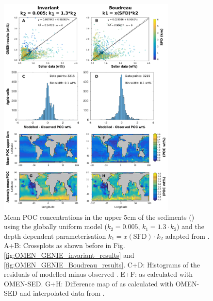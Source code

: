 \documentclass[gmd, manuscript]{copernicus}
\begin{document}
\begin{figure}[htbp]
\begin{center}
	\includegraphics[width=0.8\textwidth]{figures/OMEN-GENIE-Exp/0_2908_BOUDREAU_DEPTH_DEP_POC_BigTriangles_120118.pdf}
	\caption{Mean POC concentrations in the upper 5cm of the sediments () using the globally uniform model ($k_2 = 0.005$, $k_1 = 1.3\cdot k_2$) and the depth dependent parameterisation $k_1 = x(\mathrm{SFD}) \cdot k_2$ 
	adapted from \citet{boudreau1997diagenetic}. 
	A+B: Crossplots as shown before in Fig. \ref{fig:OMEN_GENIE_invariant_results} and \ref{fig:OMEN_GENIE_Boudreau_results}. 
	C+D: Histograms of the residuals of modelled minus observed . 
	E+F:  as calculated with OMEN-SED. 
	G+H: Difference map of  as calculated with OMEN-SED and interpolated data from \citet{seiter_organic_2004}.
	}\label{fig:OMEN_GENIE_Boudreau_depth}
\end{center}
\end{figure}
\end{document}
